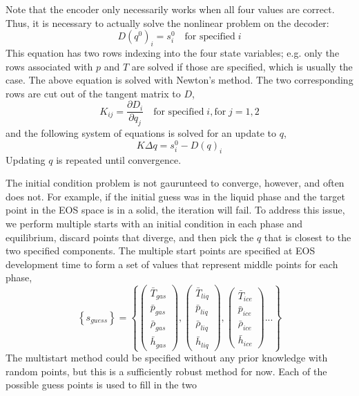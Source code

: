 \documentclass[]{article}
\begin{document}
Note that the encoder only necessarily works when all four values are
correct. Thus, it is necessary to actually solve the nonlinear problem
on the decoder:
\[D(q^0)_i = s^0_i \quad \text{for specified}\; i\]
This equation has two rows indexing into the four state variables;
e.g. only the rows associated with $p$ and $T$ are solved if those are
specified, which is usually the case. The above equation is solved
with Newton's method. The two corresponding rows are cut out of
the tangent matrix to $D$,
\[K_{ij} = \frac{\partial D_i}{\partial q_j}  \quad \text{for specified}\; i, \text{for}\;j=1,2\]
and the following system of equations is solved for an update to $q$,
\[K\Delta q = s^0_i-D(q)_i\]
Updating $q$ is repeated until convergence.

The initial condition problem is not gaurunteed to converge, however,
and often does not.
For example, if the initial guess was in the liquid phase and the target point
in the EOS space is in a solid, the iteration will fail.
To address this issue, we perform multiple starts with an initial condition in each
phase and equilibrium, discard points that diverge, and then pick the
\(q\) that is closest to the two specified components. The multiple
start points are specified at EOS development time to form a set of
values that represent middle points for each phase,
\begin{equation}
\left\{s_{guess}\right\} = \left\{ \left(\begin{array}{c}
\bar{T}_{gas}\\
\bar{p}_{gas}\\
\bar{\rho}_{gas}\\
\bar{h}_{gas}
\end{array}\right),\left(\begin{array}{c}
\bar{T}_{liq}\\
\bar{p}_{liq}\\
\bar{\rho}_{liq}\\
\bar{h}_{liq}
\end{array}\right),\left(\begin{array}{c}
\bar{T}_{ice}\\
\bar{p}_{ice}\\
\bar{\rho}_{ice}\\
\bar{h}_{ice}
\end{array}\right)... \right\}
  \end{equation}
The multistart method could be specified without any prior knowledge
with random points, but this is a sufficiently robust method for
now. Each of the possible guess points is used to fill in the two
\end{document}
